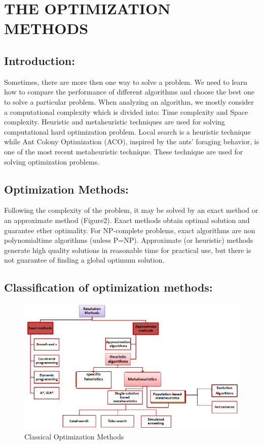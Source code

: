 \chapter{THE OPTIMIZATION METHODS}
\section*{Introduction:}
Sometimes, there are more then one way to solve a problem. We need to learn how to compare the performance of different algorithms and choose the best one to solve a particular problem. When analyzing an algorithm, we mostly consider a computational complexity which is divided into: Time complexity and Space complexity.
Heuristic and metaheuristic techniques are used for solving computational hard optimization problem. Local search is a heuristic technique while Ant Colony Optimization (ACO), inspired by the ants' foraging behavior, is one of the most recent metaheuristic technique. These technique are used for solving optimization problems.
\section{Optimization Methods:}
Following the complexity of the problem, it may be solved by an exact method or an approximate method (Figure2). Exact methods obtain optimal solution and guarantee ether optimality. For NP-complete problems, exact algorithms are non polynomialtime algorithms (unless P=NP).
Approximate (or heuristic) methods generate  high quality solutions in reasonable time for practical use, but there is not guarantee of finding a global optimum solution.
\section{Classification of optimization methods:}
\begin{figure}[H]
	\begin{center}
		\includegraphics[scale=0.8]				{Figure2.png}
		\caption{Classical Optimization 		Methods}
	\end{center}
\end{figure}
\newpage
